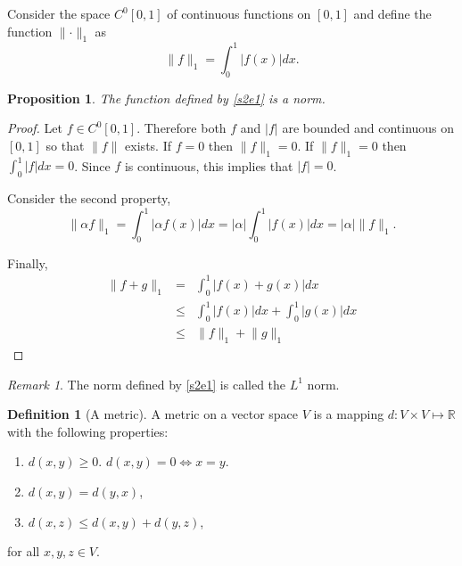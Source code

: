 \documentclass{article}
\theoremstyle{plain}
\numberwithin{thm}{section}
\theoremstyle{plain}
\newtheorem{prop}{Proposition}
\numberwithin{prop}{section}
\theoremstyle{definition}
\newtheorem{defn}{Definition}
\numberwithin{defn}{section}
\theoremstyle{remark}
\newtheorem*{rem}{Remark}
\numberwithin{equation}{section}
\begin{document}
Consider the space $C^0[0, 1]$ of continuous functions on $[0, 1]$ and define 
the function $\lVert\cdot\rVert_1$ as
\begin{equation}\label{s2e1}
\lVert f \rVert_1 = \int_0^1 |f(x)|dx.
\end{equation}
\begin{prop}\label{s2p1}
The function defined by \eqref{s2e1} is a norm.
\end{prop}
\begin{proof}
Let $f \in C^0[0, 1]$. Therefore both $f$ and $|f|$ are bounded and continuous
on $[0, 1]$ so that $\lVert f \rVert$ exists. If $f = 0$ then $\lVert f 
\rVert_1 = 0$. If $\lVert f \rVert_1 = 0$ then $\int_0^1|f|dx = 0$. Since $f$ 
is continuous, this implies that $|f| = 0$.

Consider the second property,
\[
\lVert\alpha f\rVert_1 = \int_0^1|\alpha f(x)|dx = |\alpha|\int_0^1|f(x)|dx
= |\alpha|\lVert f \rVert_1.
\]

Finally,
\begin{eqnarray*}
\lVert f + g\rVert_1 &=& \int_0^1|f(x) + g(x)|dx \\
    &\le& \int_0^1|f(x)|dx + \int_0^1|g(x)|dx \\
    &\le& \lVert f \rVert_1 + \lVert g \rVert_1
\end{eqnarray*}    
\end{proof}
\begin{rem}
The norm defined by \eqref{s2e1} is called the $L^1$ norm.
\end{rem}

\begin{defn}[A metric]\label{s2d2}
A metric on a vector space $V$ is a mapping $d: V \times V \mapsto \mathbb{R}$
with the following properties:
\begin{enumerate}
\item $d(x, y) \ge 0$. $d(x, y) = 0 \Leftrightarrow x = y$.
\item $d(x, y) = d(y, x)$,
\item $d(x, z) \le d(x, y) + d(y, z)$,
\end{enumerate}
for all $x, y, z \in V$.
\end{defn}
\end{document}
